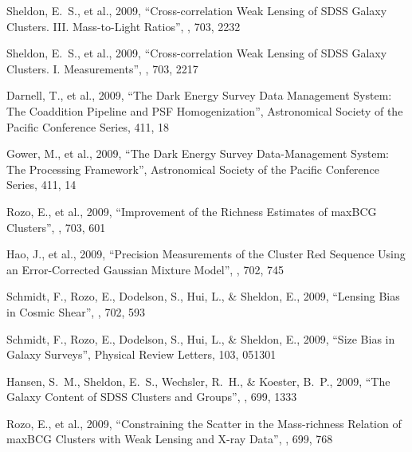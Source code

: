 \documentclass[12pt]{report}
\begin{document}

\footnotesize
\begin{thebibliography}{12}

 Sheldon, E.~S., et al.,   
2009,  ``Cross-correlation Weak Lensing of SDSS Galaxy Clusters. III. 
Mass-to-Light Ratios'', \apj, 703, 2232 


 Sheldon, E.~S., et al.,   
2009,  ``Cross-correlation Weak Lensing of SDSS Galaxy Clusters. I. 
Measurements'', \apj, 703, 2217 


 Darnell, T., et al.,   
2009,  ``The Dark Energy Survey Data Management System: The Coaddition 
Pipeline and PSF Homogenization'', Astronomical Society of the Pacific 
Conference Series, 411, 18 


 Gower, M., et al.,   
2009,  ``The Dark Energy Survey Data-Management System: The Processing 
Framework'', Astronomical Society of the Pacific Conference Series, 411, 14 


 Rozo, E., et al.,   2009,  
``Improvement of the Richness Estimates of maxBCG Clusters'', \apj, 703, 
601 


 Hao, J., et al.,   2009,  
``Precision Measurements of the Cluster Red Sequence Using an 
Error-Corrected Gaussian Mixture Model'', \apj, 702, 745 


 Schmidt, F., Rozo, E., 
Dodelson, S., Hui, L., 
\& Sheldon, E.,   2009,  ``Lensing Bias in Cosmic Shear'', \apj, 702, 593 


 Schmidt, F., Rozo, E., 
Dodelson, S., Hui, L., 
\& Sheldon, E.,   2009,  ``Size Bias in Galaxy Surveys'', Physical Review Letters, 103, 051301 


 Hansen, S.~M., Sheldon, E.~S., Wechsler, R.~H., \& Koester, B.~P.,   2009,  ``The Galaxy Content of SDSS Clusters and Groups'', \apj, 699, 1333 


 Rozo, E., et al.,   2009,  
``Constraining the Scatter in the Mass-richness Relation of maxBCG Clusters 
with Weak Lensing and X-ray Data'', \apj, 699, 768 



\end{thebibliography}
\end{document}
